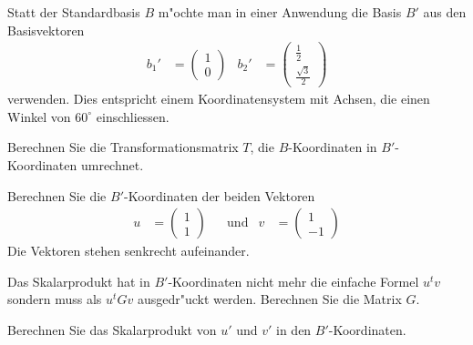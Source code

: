 Statt der Standardbasis $B$ m"ochte man in einer Anwendung die Basis
$B'$ aus den Basisvektoren
\[
\begin{aligned}
b_1'
&=
\begin{pmatrix}1\\0\end{pmatrix}
&
b_2'
&=
\begin{pmatrix}\frac12\\\frac{\sqrt{3}}2\end{pmatrix}
\end{aligned}
\]
verwenden.
Dies entspricht einem Koordinatensystem mit Achsen, die einen Winkel
von $60^\circ$ einschliessen.
\begin{teilaufgaben}
\item
Berechnen Sie die Transformationsmatrix $T$, die $B$-Koordinaten
in $B'$-Koordinaten umrechnet.
\item
Berechnen Sie die $B'$-Koordinaten der beiden Vektoren
\[
\begin{aligned}
u&=\begin{pmatrix}1\\1\end{pmatrix}
&&\text{und}&
v&=\begin{pmatrix}1\\-1\end{pmatrix}
\end{aligned}
\]
Die Vektoren stehen senkrecht aufeinander.
\item
Das Skalarprodukt hat in $B'$-Koordinaten nicht mehr die einfache
Formel $u^tv$ sondern muss als $u^tGv$ ausgedr"uckt werden.
Berechnen Sie die Matrix $G$.
\item 
Berechnen Sie das Skalarprodukt von $u'$ und $v'$ in den $B'$-Koordinaten.
\end{teilaufgaben}

